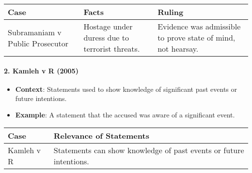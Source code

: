 \begin{longtable}[]{@{}
  >{\raggedright\arraybackslash}p{}
  >{\raggedright\arraybackslash}p{}
  >{\raggedright\arraybackslash}p{}@{}}
\toprule\noalign{}
\begin{minipage}[b]{\linewidth}\raggedright
Case
\end{minipage} & \begin{minipage}[b]{\linewidth}\raggedright
Facts
\end{minipage} & \begin{minipage}[b]{\linewidth}\raggedright
Ruling
\end{minipage} \\
\midrule\noalign{}
\endhead
\bottomrule\noalign{}
\endlastfoot
Subramaniam v Public Prosecutor & Hostage under duress due to terrorist
threats. & Evidence was admissible to prove state of mind, not
hearsay. \\
\end{longtable}

\paragraph{2. Kamleh v R (2005)}\label{kamleh-v-r-2005}

\begin{itemize}
\tightlist
\item
  \textbf{Context}: Statements used to show knowledge of significant
  past events or future intentions.
\item
  \textbf{Example}: A statement that the accused was aware of a
  significant event.
\end{itemize}

\begin{longtable}[]{@{}
  >{\raggedright\arraybackslash}p{}
  >{\raggedright\arraybackslash}p{}@{}}
\toprule\noalign{}
\begin{minipage}[b]{\linewidth}\raggedright
Case
\end{minipage} & \begin{minipage}[b]{\linewidth}\raggedright
Relevance of Statements
\end{minipage} \\
\midrule\noalign{}
\endhead
\bottomrule\noalign{}
\endlastfoot
Kamleh v R & Statements can show knowledge of past events or future
intentions. \\
\end{longtable}

